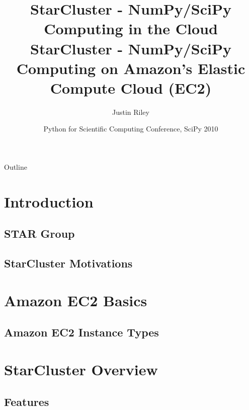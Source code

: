 \documentclass[english,compress]{beamer}
\title[StarCluster] 
{%
  StarCluster - NumPy/SciPy Computing in the Cloud%
}
\title{StarCluster - NumPy/SciPy Computing on Amazon's Elastic Compute Cloud (EC2)}
\author{Justin Riley}
\date[SciPy 2010]
{Python for Scientific Computing Conference, SciPy 2010}
\begin{document}

\frame{\titlepage}

\section[Outline]{}
\begin{frame}{Outline}
  \tableofcontents
\end{frame}

\section{Introduction}
\subsection{STAR Group}

\subsection{StarCluster Motivations}



\section{Amazon EC2 Basics}
\subsection{Amazon EC2 Instance Types}


\questionframe{}

\section{StarCluster Overview}
\subsection{Features}





\end{document}
